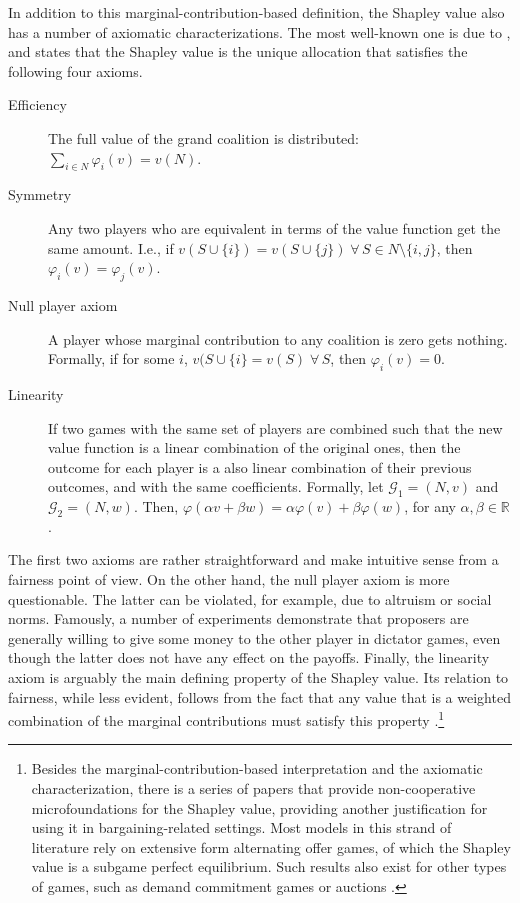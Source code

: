 In addition to this marginal-contribution-based definition, the Shapley value also has a number of axiomatic characterizations. The most well-known one is due to \textcite{shapley1953value}, and states that the Shapley value is the unique allocation that satisfies the following four axioms.
\begin{description}
    \item[Efficiency] The full value of the grand coalition is distributed: $\sum_{i \in N} \varphi_i(v) = v(N)$.
    \item[Symmetry] Any two players who are equivalent in terms of the value function get the same amount. I.e., if $v(S \cup \{i\}) = v(S \cup \{j\}) \;\forall\, S \in N \setminus \{i, j\}$, then $\varphi_i(v) = \varphi_j(v)$.
    \item[Null player axiom] A player whose marginal contribution to any coalition is zero gets nothing. Formally, if for some $i$, $v(S \cup \{i\} = v(S) \;\forall\, S$, then $\varphi_i(v) = 0$.
    \item[Linearity] If two games with the same set of players are combined such that the new value function is a linear combination of the original ones, then the outcome for each player is a also linear combination of their previous outcomes, and with the same coefficients. Formally, let $\mathcal{G}_1 = (N, v)$ and $\mathcal{G}_2 = (N, w)$. Then, $\varphi(\alpha v + \beta w) = \alpha \varphi(v) + \beta \varphi(w)$, for any $\alpha, \beta \in \mathbb{R}$.
\end{description} \label{axioms_statement}

The first two axioms are rather straightforward and make intuitive sense from a fairness point of view. On the other hand, the null player axiom is more questionable. The latter can be violated, for example, due to altruism or social norms. Famously, a number of experiments \parencite[for a meta-analysis, see][]{engel2011dictator} demonstrate that proposers are generally willing to give some money to the other player in dictator games, even though the latter does not have any effect on the payoffs. Finally, the linearity axiom is arguably the main defining property of the Shapley value. Its relation to fairness, while less evident, follows from the fact that any value that is a weighted combination of the marginal contributions must satisfy this property \parencite{weber1988probabilistic}.\footnote{Besides the marginal-contribution-based interpretation and the axiomatic characterization, there is a series of papers that provide non-cooperative microfoundations for the Shapley value, providing another justification for using it in bargaining-related settings. Most models in this strand of literature \parencite[e.g.][]{hart1996bargaining,gul1989bargaining,stole1996organizational} rely on extensive form alternating offer games, of which the Shapley value is a subgame perfect equilibrium. Such results also exist for other types of games, such as demand commitment games \parencite{winter1994demand} or auctions \parencite{van2021allocating}.}


